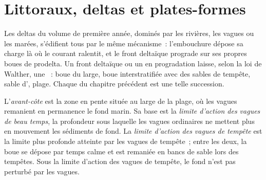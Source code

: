 \begin{omfigure}
\par{}\label{fig:b3:facies-models:rivers}
\end{omfigure}

\section{Littoraux, deltas et plates-formes}\label{sec:b3:facies-models:shelves}

Les deltas du volume de première année, dominés par les rivières, les vagues ou les marées, s'édifient tous
par le même mécanisme~: l'embouchure dépose sa charge là où le
courant ralentit, et le front deltaïque prograde sur ses propres boues de prodelta. Un
front deltaïque ou un  en progradation laisse, selon la loi de Walther, une
~: boue du large, boue interstratifiée avec des sables de tempête,
sable d', plage. Chaque  du chapitre précédent est une telle
succession.

\begin{definition}\label{def:b3:facies-models:shoreface}
L'\emph{avant-côte} est la zone en pente située au large de la
plage, où les vagues remanient en permanence le fond marin. Sa base est la
\emph{limite d'action des vagues de beau temps}, la profondeur sous
laquelle les vagues ordinaires ne mettent plus en mouvement les sédiments de fond. La \emph{limite d'action des vagues
de tempête} est la limite plus profonde atteinte par les vagues de tempête~;
entre les deux, la boue se dépose par temps calme et est remaniée en bancs de sable
lors des tempêtes. Sous la limite d'action des vagues de tempête, le fond n'est pas perturbé par les vagues.
\end{definition}


